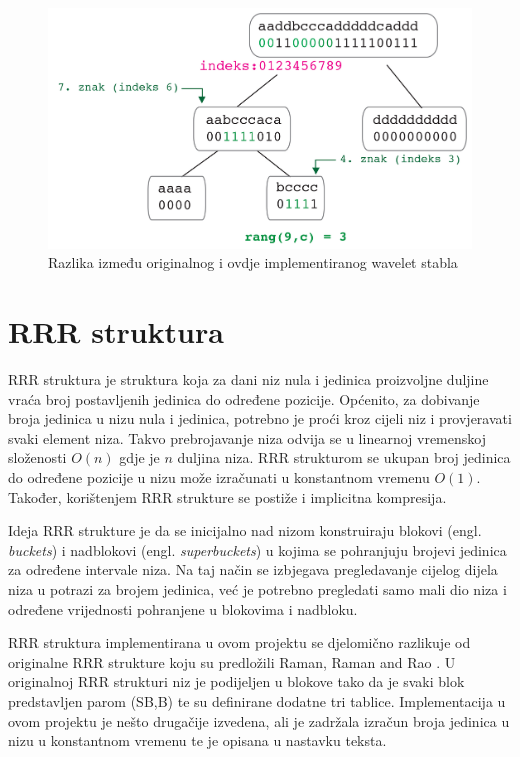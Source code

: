 \begin{figure}[H]
\centering
\includegraphics[width=\linewidth]{./pictures/Waveletquery.jpg}
\caption{Razlika između originalnog i ovdje implementiranog wavelet stabla}\label{query}
\end{figure}


\section{RRR struktura}
RRR struktura je struktura koja za dani niz nula i jedinica proizvoljne duljine vraća broj postavljenih jedinica do određene pozicije. Općenito, za dobivanje broja jedinica u nizu nula i jedinica, potrebno je proći kroz cijeli niz i provjeravati svaki element niza. Takvo prebrojavanje niza odvija se u linearnoj vremenskoj složenosti $O(n)$ gdje je $n$ duljina niza. RRR strukturom se ukupan broj jedinica do određene pozicije u nizu može izračunati u konstantnom vremenu $O(1)$. Također, korištenjem RRR strukture se postiže i implicitna kompresija. 

Ideja RRR strukture je da se inicijalno nad nizom konstruiraju blokovi (engl. \textit{buckets}) i nadblokovi (engl. \textit{superbuckets}) u kojima se pohranjuju brojevi jedinica za određene intervale niza. Na taj način se izbjegava pregledavanje cijelog dijela niza u potrazi za brojem jedinica, već je potrebno pregledati samo mali dio niza i određene vrijednosti pohranjene u blokovima i nadbloku. 

RRR struktura implementirana u ovom projektu se djelomično razlikuje od originalne RRR strukture koju su predložili Raman, Raman and Rao \cite{rrr1}. U originalnoj RRR strukturi niz je podijeljen u blokove tako da je svaki blok predstavljen parom (SB,B) te su definirane dodatne tri tablice\cite{rrr2}. Implementacija u ovom projektu je nešto drugačije izvedena, ali je zadržala izračun broja jedinica u nizu u konstantnom vremenu te je opisana u nastavku teksta.

